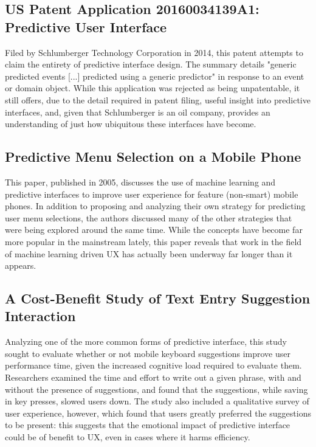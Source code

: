 \documentclass[format=acmsmall, nonacm, authorversion, screen]{acmart}
\begin{document}
\subsection{US Patent Application 20160034139A1: Predictive User Interface \citep{schlumberg2014predictive}}
Filed by Schlumberger Technology Corporation in 2014, this patent attempts to claim the entirety of predictive interface design. The summary details "generic predicted events [...] predicted using a generic predictor" in response to an event or domain object. While this application was rejected as being unpatentable, it still offers, due to the detail required in patent filing, useful insight into predictive interfaces, and, given that Schlumberger is an oil company, provides an understanding of just how ubiquitous these interfaces have become.

\subsection{Predictive Menu Selection on a Mobile Phone \citep{bridle2005predictive}}
This paper, published in 2005, discusses the use of machine learning and predictive interfaces to improve user experience for feature (non-smart) mobile phones. In addition to proposing and analyzing their own strategy for predicting user menu selections, the authors discussed many of the other strategies that were being explored around the same time. While the concepts have become far more popular in the mainstream lately, this paper reveals that work in the field of machine learning driven UX has actually been underway far longer than it appears.

\subsection{A Cost-Benefit Study of Text Entry Suggestion Interaction \citep{quinn2016costbenefit}}
Analyzing one of the more common forms of predictive interface, this study sought to evaluate whether or not mobile keyboard suggestions improve user performance time, given the increased cognitive load required to evaluate them. Researchers examined the time and effort to write out a given phrase, with and without the presence of suggestions, and found that the suggestions, while saving in key presses, slowed users down. The study also included a qualitative survey of user experience, however, which found that users greatly preferred the suggestions to be present: this suggests that the emotional impact of predictive interface could be of benefit to UX, even in cases where it harms efficiency.
\end{document}
